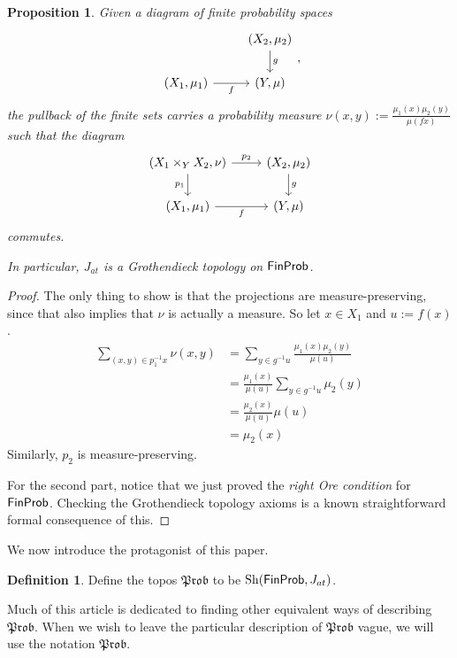 \documentclass[a4paper]{amsproc}
\theoremstyle{plain}
\newtheorem{proposition}[theorem]{Proposition}
\theoremstyle{definition}
\newtheorem{definition}[theorem]{Definition}
\theoremstyle{remark}
\numberwithin{equation}{section}
\DeclareMathOperator{\Sh}{Sh}
\newcommand{\FinProb}{\textup{\textsf{FinProb}}}
\newcommand{\Prob}{\mathfrak{Prob}}
\begin{document}
\begin{proposition} \label{pullback_measure}
    Given a diagram of finite probability spaces
    \[
    \begin{tikzcd}
                                & {(X_2,\mu_2)} \arrow[d, "g"] \\
    {(X_1, \mu_1)} \arrow[r, "f"'] & {(Y,\mu)}
    \end{tikzcd},
    \]
    the pullback of the finite sets carries a probability measure $\nu(x,y) := \frac{\mu_1(x) \mu_2(y)}{\mu(f x)}$ such that the diagram
    \[
    \begin{tikzcd}
    {(X_1 \times_Y X_2, \nu)} \arrow[d, "p_1"'] \arrow[r, "p_2"] & {(X_2,\mu_2)} \arrow[d, "g"] \\
    {(X_1, \mu_1)} \arrow[r, "f"']                               & {(Y,\mu)}
    \end{tikzcd}
    \]
    commutes.

    In particular, $J_{at}$ is a Grothendieck topology on $\FinProb$.
\end{proposition}
\begin{proof}
    The only thing to show is that the projections are measure-preserving, since that also implies that $\nu$ is actually a measure. So let $x \in X_1$ and $u := f(x)$.
    \begin{align*}
        \sum_{(x,y) \in p_1^{-1} x} \nu(x,y) &= \sum_{y \in g^{-1} u} \frac{\mu_1(x)\mu_2(y)}{\mu(u)} \\
        &= \frac{\mu_1(x)}{\mu(u)} \sum_{y \in g^{-1} u} \mu_2(y) \\
        &= \frac{\mu_2(x)}{\mu(u)} \mu(u) \\
        &= \mu_2(x)
    \end{align*}
    Similarly, $p_2$ is measure-preserving.

    For the second part, notice that we just proved the \emph{right Ore condition} for $\FinProb$. Checking the Grothendieck topology axioms is a known straightforward formal consequence of this.
\end{proof}

We now introduce the protagonist of this paper.

\begin{definition}
    Define the topos $\Prob$ to be $\Sh(\FinProb, J_{at})$.
\end{definition}

Much of this article is dedicated to finding other equivalent ways of describing $\Prob$. When we wish to leave the particular description of $\Prob$ vague, we will use the notation $\Prob$.
\end{document}
